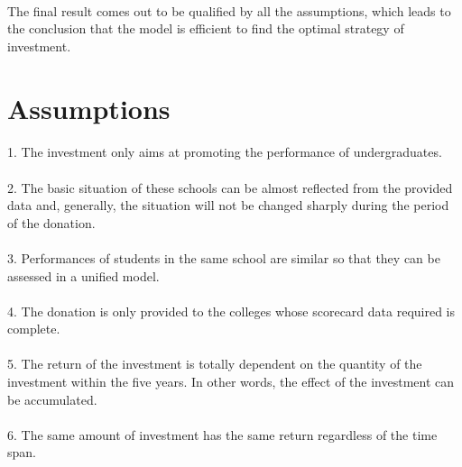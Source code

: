 \documentclass{mcmthesis}
\begin{document}
\paragraph{} The final result comes out to be qualified by all the assumptions, which leads to the conclusion that the model is efficient to find the optimal strategy of investment. 

\section{Assumptions}
\paragraph{} 1. The investment only aims at promoting the performance of undergraduates.
\paragraph{} 2. The basic situation of these schools can be almost reflected from the provided data and, generally, the situation will not be changed sharply during the period of the donation.
\paragraph{} 3. Performances of students in the same school are similar so that they can be assessed in a unified model.
\paragraph{} 4. The donation is only provided to the colleges whose scorecard data required is complete. 
\paragraph{} 5. The return of the investment is totally dependent on the quantity of the investment within the five years. In other words, the effect of the investment can be accumulated.
\paragraph{} 6. The same amount of investment has the same return regardless of the time span.
\end{document}
